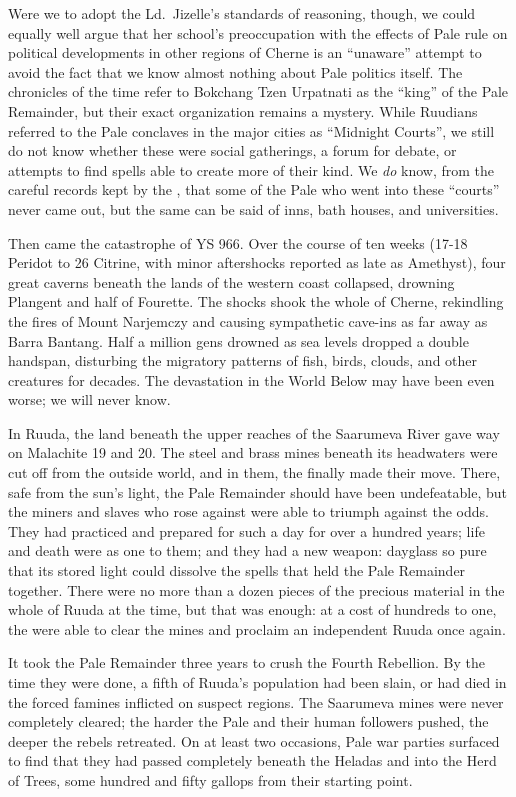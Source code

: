 \documentclass[12pt]{report}
\begin{document}
Were we to adopt the Ld.\ Jizelle's standards of reasoning, though, we
could equally well argue that her school's preoccupation with the
effects of Pale rule on political developments in other regions of
Cherne is an ``unaware'' attempt to avoid the fact that we know almost
nothing about Pale politics itself.  The chronicles of the time refer
to Bokchang Tzen Urpatnati as the ``king'' of the Pale Remainder, but
their exact organization remains a mystery.  While Ruudians referred
to the Pale conclaves in the major cities as ``Midnight Courts'', we
still do not know whether these were social gatherings, a forum for
debate, or attempts to find spells able to create more of their kind.
We \emph{do} know, from the careful records kept by the {\aemott},
that some of the Pale who went into these ``courts'' never came out, but
the same can be said of inns, bath houses, and universities.

Then came the catastrophe of YS 966.  Over the course of ten weeks
(17-18 Peridot to 26 Citrine, with minor aftershocks reported as late
as Amethyst), four great caverns beneath the lands of the western
coast collapsed, drowning Plangent and half of Fourette.  The shocks
shook the whole of Cherne, rekindling the fires of Mount Narjemczy and
causing sympathetic cave-ins as far away as Barra Bantang.  Half a
million gens drowned as sea levels dropped a double handspan,
disturbing the migratory patterns of fish, birds, clouds, and other
creatures for decades.  The devastation in the World Below may have
been even worse; we will never know.

In Ruuda, the land beneath the upper reaches of the Saarumeva River
gave way on Malachite 19 and 20.  The steel and brass mines beneath
its headwaters were cut off from the outside world, and in them, the
{\aemott} finally made their move.  There, safe from the sun's light,
the Pale Remainder should have been undefeatable, but the miners and
slaves who rose against were able to triumph against the odds.  They
had practiced and prepared for such a day for over a hundred years;
life and death were as one to them; and they had a new weapon:
dayglass so pure that its stored light could dissolve the spells that
held the Pale Remainder together.  There were no more than a dozen
pieces of the precious material in the whole of Ruuda at the time, but
that was enough: at a cost of hundreds to one, the {\aemott} were able
to clear the mines and proclaim an independent Ruuda once again.

It took the Pale Remainder three years to crush the Fourth Rebellion.
By the time they were done, a fifth of Ruuda's population had been
slain, or had died in the forced famines inflicted on suspect regions.
The Saarumeva mines were never completely cleared; the harder the Pale
and their human followers pushed, the deeper the rebels retreated.  On
at least two occasions, Pale war parties surfaced to find that they
had passed completely beneath the Heladas and into the Herd of Trees,
some hundred and fifty gallops from their starting point.
\end{document}
